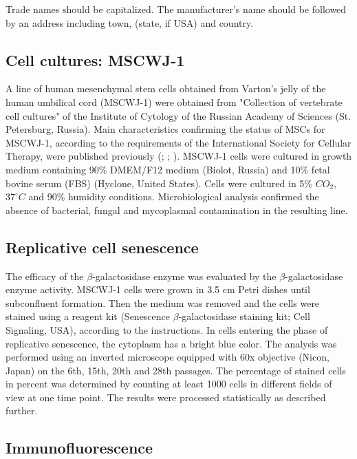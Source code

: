 \documentclass[alpha-refs]{wiley-article}
\begin{document}
Trade names should be capitalized. The manufacturer's name should be followed by an address including town, (state, if USA) and country.

\subsection{Cell cultures: MSCWJ-1}

A line of human mesenchymal stem cells obtained from Varton's jelly of the human umbilical cord (MSCWJ-1) were obtained from "Collection of vertebrate cell cultures" of the Institute of Cytology of the Russian Academy of Sciences (St. Petersburg, Russia).
Main characteristics confirming the status of MSCs for MSCWJ-1, according to the requirements of the International Society for Cellular Therapy, were published previously (\cite{dominici2006minimal}; \cite{sensebe2010mesenchymal}; \cite{krylova2017derivation}).
MSCWJ-1 cells were cultured in growth medium containing 90\% DMEM/F12 medium (Biolot, Russia) and 10\% fetal bovine serum (FBS) (Hyclone, United States).
Cells were cultured in 5\% $CO_2$, $37^{\circ}  C$ and 90\% humidity conditions.
Microbiological analysis confirmed the absence of bacterial, fungal and mycoplasmal contamination in the resulting line.

\subsection{Replicative cell senescence}

The efficacy of the $\beta$-galactosidase enzyme was evaluated by the $\beta$-galactosidase enzyme activity.
MSCWJ-1 cells were grown in 3.5 cm Petri dishes until subconfluent formation.
Then the medium was removed and the cells were stained using a reagent kit (Senescence $\beta$-galactosidase staining kit; Cell Signaling, USA), according to the instructions.
In cells entering the phase of replicative senescence, the cytoplasm has a bright blue color.
The analysis was performed using an inverted microscope equipped with 60x objective (Nicon, Japan) on the 6th, 15th, 20th and 28th passages.
The percentage of stained cells in percent was determined by counting at least 1000 cells in different fields of view at one time point.
The results were processed statistically as described further.

\subsection{Immunofluorescence}
\end{document}
